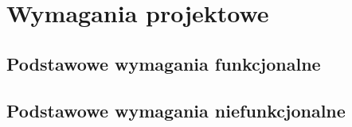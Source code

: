 \section{Wymagania projektowe}
\subsection{Podstawowe wymagania funkcjonalne}
\subsection{Podstawowe wymagania niefunkcjonalne}
